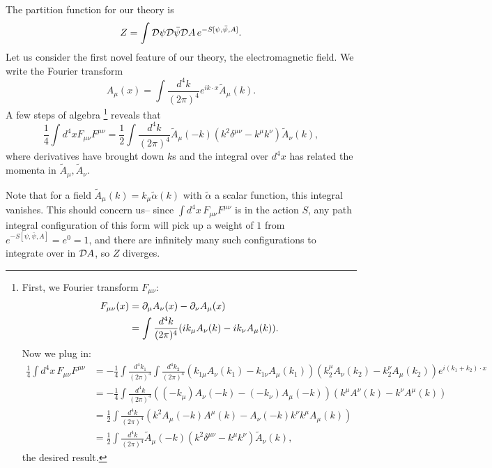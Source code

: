 The partition function for our theory is
\begin{equation}
    Z=\int \mathcal{D} \psi \mathcal{D} \bar \psi \mathcal{D} A \, e^{-S[\psi,\bar \psi,A]}.
\end{equation}
Let us consider the first novel feature of our theory, the electromagnetic field. We write the Fourier transform
\begin{equation}
    A_\mu(x)=\int \frac{d^4k}{(2\pi)^4} e^{ik\cdot x}\tilde A_\mu(k).
\end{equation}
A few steps of algebra%
    \footnote{First, we Fourier transform $F_{\mu\nu}$:
    \begin{align*}
        F_{\mu\nu}(x)&=\partial_\mu A_\nu(x) -\partial_\nu A_\mu(x)\\
            &= \int \frac{d^4k}{(2\pi)^4}(ik_\mu A_\nu(k) - i k_\nu A_\mu(k)).
    \end{align*}
    Now we plug in:
    \begin{align*}
        \frac{1}{4}\int d^4x \, F_{\mu\nu} F^{\mu\nu} &= -\frac{1}{4}\int \frac{d^4k_1}{(2\pi)^4} \int \frac{d^4k_2}{(2\pi)^4}
            (k_{1\mu} A_\nu(k_1)-k_{1\nu} A_\mu(k_1))(k_2^\mu A_\nu(k_2)-k_2^\nu A_\mu(k_2)) e^{i(k_1+k_2)\cdot x}\\
            &= -\frac{1}{4}\int \frac{d^4k}{(2\pi)^4} ((-k_\mu) A_\nu(-k)-(-k_\nu) A_\mu(-k))(k^\mu A^\nu(k) -k^\nu A^\mu(k))\\
            &= \frac{1}{2} \int \frac{d^4k}{(2\pi)^4} (k^2 A_\mu(-k) A^\mu(k) - A_\nu(-k) k^\nu k^\mu A_\mu(k))\\
            &= \frac{1}{2}\int\frac{d^4k}{(2\pi)^4} \tilde A_\mu(-k)(k^2\delta^{\mu\nu}-k^\mu k^\nu)\tilde A_\nu(k),
    \end{align*}
    the desired result.
    }
reveals that
\begin{equation}
    \frac{1}{4}\int d^4x F_{\mu\nu}F^{\mu\nu} = \frac{1}{2}\int\frac{d^4k}{(2\pi)^4} \tilde A_\mu(-k)(k^2\delta^{\mu\nu}-k^\mu k^\nu)\tilde A_\nu(k),
\end{equation}
where derivatives have brought down $k$s and the integral over $d^4x$ has related the momenta in $\tilde A_\mu,\tilde A_\nu$.

Note that for a field $\tilde A_\mu(k)=k_\mu \tilde \alpha(k)$ with $\tilde \alpha$ a scalar function, this integral vanishes. This should concern us-- since $\int d^4x \,F_{\mu\nu} F^{\mu\nu}$ is in the action $S$, any path integral configuration of this form will pick up a weight of $1$ from $e^{-S[\psi,\bar\psi,A]}=e^0=1$, and there are infinitely many such configurations to integrate over in $\mathcal{D} A$, so $Z$ diverges. 


